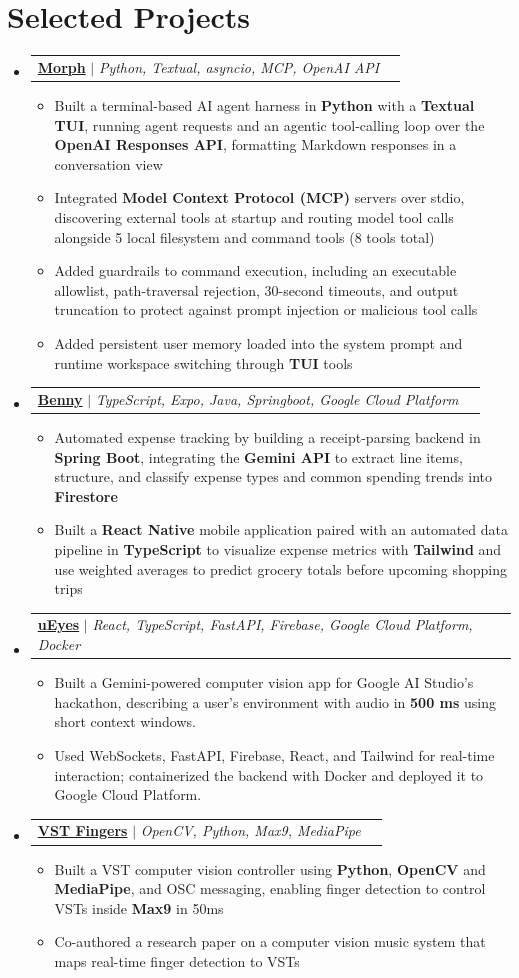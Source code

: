 \documentclass[letterpaper,10pt]{article}
\makeatletter
\newcommand{\resumeItem}[1]{
  \item\small{
    {#1 \vspace{-1pt}}
  }
}
\newcommand{\resumeProjectHeading}[2]{
    \item
    \begin{tabularx}{0.97\textwidth}{@{}Xr@{}}
      \small#1 & #2 \\
    \end{tabularx}\vspace{-6pt}
}
\newcommand{\resumeSubHeadingListStart}{\begin{itemize}[leftmargin=0.15in, label={}]}
\newcommand{\resumeSubHeadingListEnd}{\end{itemize}}
\newcommand{\resumeItemListStart}{\begin{itemize}[label=$\bullet$, itemsep=1.80pt, topsep=0pt, parsep=0pt]}
\newcommand{\resumeItemListEnd}{\end{itemize}\vspace{-2pt}}
\makeatother
\begin{document}
\section{Selected Projects}
\resumeSubHeadingListStart
\resumeProjectHeading{\href{https://github.com/samnne/morph-ai}{\textbf{Morph}} $|$ \emph{Python, Textual, asyncio, MCP, OpenAI API}}{}
\resumeItemListStart
  \resumeItem{Built a terminal-based AI agent harness in \textbf{Python} with a \textbf{Textual} \textbf{TUI}, running agent requests and an agentic tool-calling loop over the \textbf{OpenAI Responses \textbf{API}}, formatting Markdown responses in a conversation view}
  \resumeItem{Integrated \textbf{Model Context Protocol (\textbf{MCP})} servers over stdio, discovering external tools at startup and routing model tool calls alongside 5 local filesystem and command tools (8 tools total)}
  \resumeItem{Added guardrails to command execution, including an executable allowlist, path-traversal rejection, 30-second timeouts, and output truncation to protect against prompt injection or malicious tool calls}
  \resumeItem{Added persistent user memory loaded into the system prompt and runtime workspace switching through \textbf{TUI} tools}
\resumeItemListEnd
\resumeProjectHeading{\href{https://github.com/samnne/benny}{\textbf{Benny}} $|$ \emph{TypeScript, Expo, Java, Springboot, Google Cloud Platform}}{}
\resumeItemListStart
  \resumeItem{Automated expense tracking by building a receipt-parsing backend in \textbf{Spring Boot}, integrating the \textbf{Gemini API} to extract line items, structure, and classify expense types and common spending trends into \textbf{Firestore}}
  \resumeItem{Built a \textbf{React Native} mobile application paired with an automated data pipeline in \textbf{TypeScript} to visualize expense metrics with \textbf{Tailwind} and use weighted averages to predict grocery totals before upcoming shopping trips}
\resumeItemListEnd
\resumeProjectHeading{\href{https://github.com/samnne/u-eyes}{\textbf{uEyes}} $|$ \emph{React, TypeScript, FastAPI, Firebase, Google Cloud Platform, Docker}}{}
\resumeItemListStart
  \resumeItem{Built a Gemini-powered computer vision app for Google AI Studio's hackathon, describing a user's environment with audio in \textbf{500 ms} using short context windows.}
  \resumeItem{Used WebSockets, FastAPI, Firebase, React, and Tailwind for real-time interaction; containerized the backend with Docker and deployed it to Google Cloud Platform.}
\resumeItemListEnd
\resumeProjectHeading{\href{https://github.com/samnne/vst-fingers}{\textbf{VST Fingers}} $|$ \emph{OpenCV, Python, Max9, MediaPipe}}{}
\resumeItemListStart
  \resumeItem{Built a VST computer vision controller using \textbf{Python}, \textbf{OpenCV} and \textbf{MediaPipe}, and OSC messaging, enabling finger detection to control VSTs inside \textbf{Max9} in 50ms}
  \resumeItem{Co-authored a research paper on a computer vision music system that maps real-time finger detection to VSTs}
\resumeItemListEnd
\resumeSubHeadingListEnd
\end{document}

